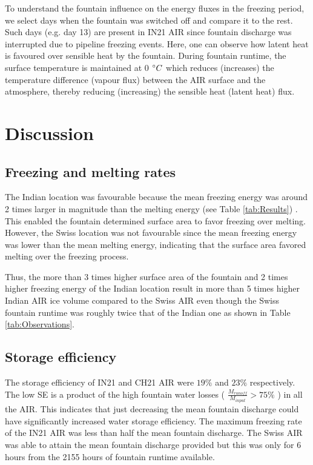 \documentclass[utf8]{frontiersSCNS} %
\begin{document}
To understand the fountain influence on the energy fluxes in the freezing period, we select days when the
fountain was switched off and compare it to the rest. Such days (e.g. day 13) are present in IN21 AIR since
fountain discharge was interrupted due to pipeline freezing events. Here, one can observe how latent heat is
favoured over sensible heat by the fountain. During fountain runtime, the surface temperature is maintained at 0
$\degree C$ which reduces (increases) the temperature difference (vapour flux) between the AIR surface and the
atmosphere, thereby reducing (increasing) the sensible heat (latent heat) flux.

\section{Discussion}
\subsection{Freezing and melting rates}
The Indian location was favourable because the mean freezing energy was around 2 times larger in magnitude than the
melting energy (see Table \ref{tab:Results}) . This enabled the fountain determined surface area to favor freezing over melting. However, the
Swiss location was not favourable since the mean freezing energy was lower than the mean melting energy, indicating that the
surface area favored melting over the freezing process.

Thus, the more than 3 times higher surface area of the fountain and 2 times higher freezing energy of the Indian
location result in more than 5 times higher Indian AIR ice volume compared to the Swiss AIR even though the Swiss
fountain runtime was roughly twice that of the Indian one as shown in Table \ref{tab:Observations}.

\subsection{Storage efficiency}
The storage efficiency of IN21 and CH21 AIR were $19\%$ and $23\%$ respectively. The low SE is a product of the
high  fountain water losses ( $\frac{M_{runoff}}{M_{input}}> 75 \%$ ) in all the AIR. This indicates that just
decreasing the mean fountain discharge could have significantly increased water storage efficiency.  The maximum
freezing rate of the IN21 AIR was less than half the mean fountain discharge. The Swiss AIR was able to attain the
mean fountain discharge provided but this was only for 6 hours from the 2155 hours of fountain runtime available.
\end{document}
